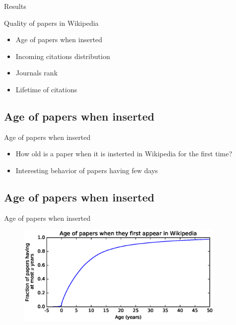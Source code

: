 \documentclass{beamer}
\begin{document}
\begin{frame}[c]
\Huge{\centerline{Results}}
\end{frame}

\begin{frame}{Quality of papers in Wikipedia}
\begin{itemize}
    \item Age of papers when inserted
    \item Incoming citations distribution
    \item Journals rank
    \item Lifetime of citations
\end{itemize}
\end{frame}

\subsection{Age of papers when inserted}
\begin{frame}{Age of papers when inserted}
    \begin{itemize}
        \item How old is a paper when it is insterted in Wikipedia for the first time?
        \item Interesting behavior of papers having few days
    \end{itemize}
\end{frame}

\subsection{Age of papers when inserted}
\begin{frame}{Age of papers when inserted}
    \begin{figure}
    \centering
    \includegraphics[width=0.9\textwidth]{assets/age_of_papers_at_first_appearance_cdf_slides}
    \end{figure}
\end{frame}
\end{document}

